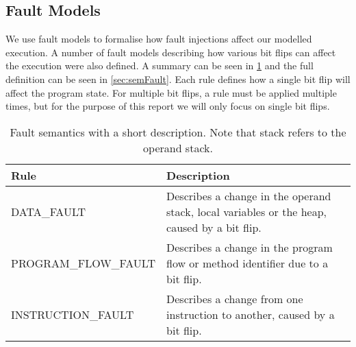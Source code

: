 \subsection{Fault Models}
We use fault models to formalise how fault injections affect our modelled execution. A number of fault models describing how various bit flips can affect the execution were also defined. A summary can be seen in \cref{tab:fault} and the full definition can be seen in \cref{sec:semFault}. Each rule defines how a single bit flip will affect the program state. For multiple bit flips, a rule must be applied multiple times, but for the purpose of this report we will only focus on single bit flips.

\begin{table}[H]
\centering
\label{tab:fault}
\begin{tabular}{p{}|p{}}
\textbf{Rule} 					  & \textbf{Description} \\ \hline
DATA\_FAULT             		  & Describes a change in the operand stack, local variables or the heap, caused by a bit flip.\\ \hline 
PROGRAM\_FLOW\_FAULT			  & Describes a change in the program flow or method identifier due to a bit flip. \\ \hline
INSTRUCTION\_FAULT				  & Describes a change from one instruction to another, caused by a bit flip. \\ \hline
\end{tabular}
\caption{Fault semantics with a short description. Note that stack refers to the operand stack.}
\end{table}